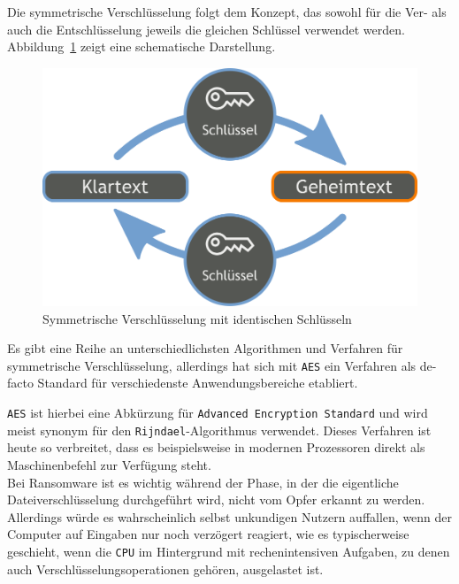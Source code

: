 \label{sec:sym_verschl}

Die symmetrische Verschlüsselung folgt dem Konzept, das sowohl für die Ver- als auch die Entschlüsselung jeweils die gleichen Schlüssel verwendet werden. \\
Abbildung~\ref{fig:sym_verschl} zeigt eine schematische Darstellung.

\begin{figure}[h!]
	\centering
	\includegraphics[scale=0.22]{img/SymKrypto.png}
	\caption{Symmetrische Verschlüsselung mit identischen Schlüsseln \cite{img:crypto:sym}}
	\label{fig:sym_verschl}
\end{figure}

Es gibt eine Reihe an unterschiedlichsten Algorithmen und Verfahren für symmetrische Verschlüsselung, allerdings hat sich mit \texttt{AES} ein Verfahren als de-facto Standard für verschiedenste Anwendungsbereiche etabliert.

\texttt{AES} ist hierbei eine Abkürzung für \texttt{Advanced Encryption Standard} und wird meist synonym für den \texttt{Rijndael}-Algorithmus verwendet. Dieses Verfahren ist heute so verbreitet, dass es beispielsweise in modernen Prozessoren direkt als Maschinenbefehl zur Verfügung steht. \cite{crypto:aes_intel} 
\\

Bei Ransomware ist es wichtig während der Phase, in der die eigentliche Dateiverschlüsselung durchgeführt wird, nicht vom Opfer erkannt zu werden. Allerdings würde es wahrscheinlich selbst unkundigen Nutzern auffallen, wenn der Computer auf Eingaben nur noch verzögert reagiert, wie es typischerweise geschieht, wenn die \texttt{CPU} im Hintergrund mit rechenintensiven Aufgaben, zu denen auch Verschlüsselungsoperationen gehören, ausgelastet ist.

